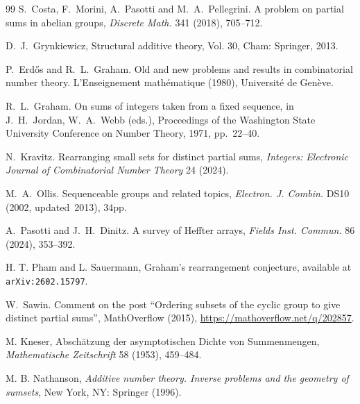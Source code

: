 \documentclass[11pt]{amsart}
\theoremstyle{definition}
\begin{document}
\begin{thebibliography}{99}
S.~Costa, F.~Morini, A.~Pasotti and M.~A.~Pellegrini.
A problem on partial sums in abelian groups,
{\em Discrete Math.} 341 (2018), 705--712.

D.~J.~Grynkiewicz, 
Structural additive theory,
Vol. 30, Cham: Springer, 2013.

P.~Erd\H{o}s and R.~L.~Graham.
Old and new problems and results in combinatorial number theory.
L'Enseignement math\'ematique (1980), Universit\'e de Gen\`eve.

R.~L.~Graham.
On sums of integers taken from a fixed sequence,
in J.~H.~Jordan, W.~A.~Webb (eds.), Proceedings of the Washington State University Conference
on Number Theory, 1971, pp.~22--40.

N.~Kravitz.
Rearranging small sets for distinct partial sums,
{\em Integers: Electronic Journal of Combinatorial Number Theory} 24 (2024).

M.~A.~Ollis.
Sequenceable groups and related topics,
{\em Electron. J. Combin.} DS10 (2002, updated~2013), 34pp.


A.~Pasotti and J.~H.~Dinitz.
A survey of Heffter arrays,
{\em Fields Inst. Commun.} 86 (2024), 353--392.

 H. T. Pham and L. Sauermann, Graham's rearrangement conjecture, available at \texttt{arXiv:2602.15797}.

W.~Sawin.
Comment on the post ``Ordering subsets of the cyclic group to give distinct partial sums'',
MathOverflow (2015), \url{https://mathoverflow.net/q/202857}.

M. Kneser,
Absch{\"a}tzung der asymptotischen {Dichte} von {Summenmengen}, {\em Mathematische Zeitschrift} 58 (1953), 459--484.

M. B. Nathanson, 
{\em Additive number theory. Inverse problems and the geometry of sumsets}, New York, NY: Springer (1996).

\end{thebibliography}
\end{document}
